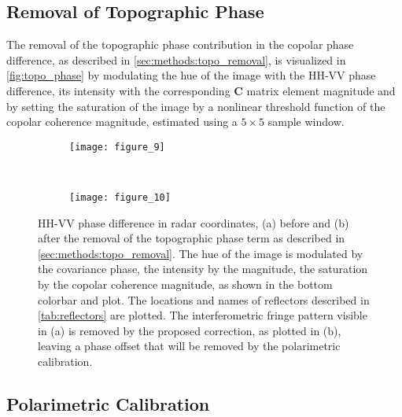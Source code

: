 \subsection{Removal of Topographic Phase}\label{sec:results:topo_removal}
The removal of the topographic phase contribution in the copolar phase difference, as described in \autoref{sec:methods:topo_removal}, is visualized in  \autoref{fig:topo_phase} by modulating the hue of the image with the HH-VV phase difference, its intensity with the corresponding $\mathbf{C}$ matrix element magnitude and by setting the saturation of the image by a nonlinear threshold function of the copolar coherence magnitude, estimated using a $\mathrm{5 \times 5}$ sample window. 
\begin{figure*}[hb]
	\centering
	\begin{subfigure}[t]{0.5\textwidth}
	\centering
	\texttt{[image: figure\_9]}
	\label{fig:topo_phase:uncorrected}
	\end{subfigure}\\
	\begin{subfigure}[t]{0.5\textwidth}
	\centering
	\texttt{[image: figure\_10]}
	\label{fig:topo_phase:corrected}
	\end{subfigure}
	\caption{HH-VV phase difference in radar coordinates, (a) before and (b)  after the removal of the topographic phase term as described in \autoref{sec:methods:topo_removal}. The hue of the image is modulated by the covariance phase, the intensity by the magnitude, the saturation by the copolar coherence magnitude, as shown in the bottom colorbar and plot. The locations and names of reflectors described in \autoref{tab:reflectors} are plotted. The interferometric fringe pattern visible in (a) is removed by the proposed correction, as plotted in (b), leaving a phase offset that will be removed by the polarimetric calibration.}
	\label{fig:topo_phase}
\end{figure*}
\subsection{Polarimetric Calibration}\label{sec:results:proc_polcal}

